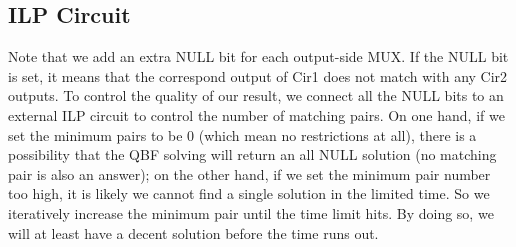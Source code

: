 \subsection{ILP Circuit}
 Note that we add an extra NULL bit for each output-side MUX. If the NULL bit is set, it means that the correspond output of Cir1 does not match with any Cir2 outputs.
To control the quality of our result, we connect all the NULL bits to an external ILP circuit to control the number of matching pairs. On one hand, if we set the minimum pairs to be 0 (which mean no restrictions at all), there is a possibility that the QBF solving will return an all NULL solution (no matching pair is also an answer); on the other hand, if we set the minimum pair number too high, it is likely we cannot find a single solution in the limited time. So we iteratively increase the minimum pair until the time limit hits. By doing so, we will at least have a decent solution before the time runs out.


